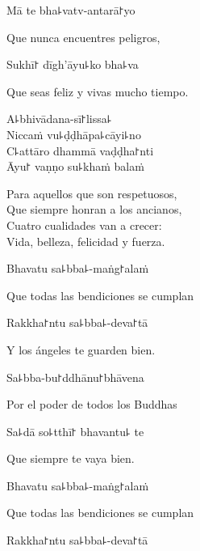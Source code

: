 Mā te bha꜕vatv-antarā꜓yo

\begin{english}
  Que nunca encuentres peligros,
\end{english}

Sukhī꜓ dīgh'āyu꜕ko bha꜕va

\begin{english}
  Que seas feliz y vivas mucho tiempo.
\end{english}

A꜕bhivādana-sī꜓lissa꜕\\
Niccaṁ vu꜕ḍḍhāpa꜕cāyi꜕no\\
C꜕attāro dhammā vaḍḍha꜓nti\\
Āyu꜓ vaṇṇo su꜕khaṁ balaṁ

\begin{english}
  Para aquellos que son respetuosos,\\
  Que siempre honran a los ancianos,\\
  Cuatro cualidades van a crecer:\\
  Vida, belleza, felicidad y fuerza.
\end{english}

Bhavatu sa꜕bba꜕-maṅg꜓alaṁ

\begin{english}
  Que todas las bendiciones se cumplan
\end{english}

Rakkha꜓ntu sa꜕bba꜕-deva꜓tā

\begin{english}
  Y los ángeles te guarden bien.
\end{english}

Sa꜕bba-bu꜓ddhānu꜓bhāvena

\begin{english}
  Por el poder de todos los Buddhas
\end{english}

Sa꜕dā so꜕tthī꜓ bhavantu꜕ te

\begin{english}
  Que siempre te vaya bien.
\end{english}

\ifaivedition
\clearpage
\fi

Bhavatu sa꜕bba꜕-maṅg꜓alaṁ

\begin{english}
  Que todas las bendiciones se cumplan
\end{english}

Rakkha꜓ntu sa꜕bba꜕-deva꜓tā

